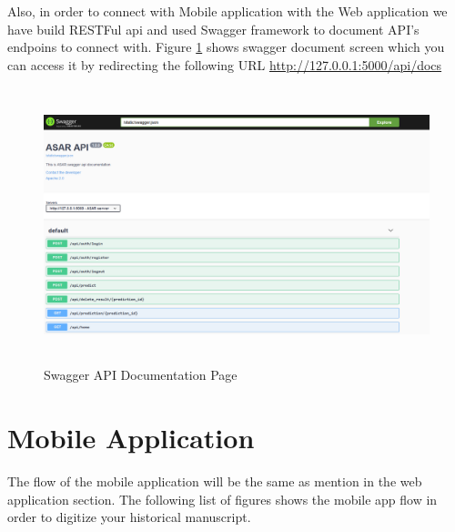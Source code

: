 Also, in order to connect with Mobile application with the Web application we have build RESTFul \acrshort{api} and used Swagger framework to document API's endpoins to connect with. Figure \ref{fig:web-swagger} shows swagger document screen which you can access it by redirecting the following URL \href{http://127.0.0.1:5000/api/docs}{http://127.0.0.1:5000/api/docs}

\begin{figure}[H]
    \centering
    \includegraphics[width=14cm,height=8cm]{images/app/web/web-api-docs.PNG}
    \caption{Swagger API Documentation Page}
    \label{fig:web-swagger}
\end{figure}

\clearpage

\section{Mobile Application}

The flow of the mobile application will be the same as mention in the web application section. The following list of figures shows the mobile app flow in order to digitize your historical manuscript.

